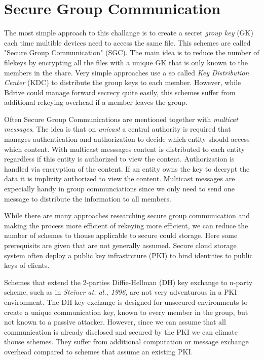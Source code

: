 \section{Secure Group Communication}
The most simple approach to this challange is to create a secret \textit{group key} (GK) each time multible devices need to access the same file. This schemes are called "Secure Group Communication" (SGC). The main idea is to reduce the number of filekeys by encrypting all the files with a unique GK that is only known to the members in the share. Very simple approaches use a so called \textit{Key Distribution Center} (KDC) to distribute the group keys to each member. However, while Bdrive could manage forward secrecy quite easily, this schemes suffer from additional rekeying overhead if a member leaves the group. 

Often Secure Group Communications are mentioned together with \textit{multicat messages}. The idea is that on \textit{unicast} a central authority is required that manages authentication and authorization to decide which entity should access which content. With multicast messsages content is distributed to each entity regardless if this entity is authorized to view the content. Authorization is handled via encryption of the content. If an entity owns the key to decrypt the data it is implizity authorized to view the content. Multicast messages are expecially handy in group communciations since we only need to send one message to distribute the information to all members. 

While there are many approaches researching secure group communication and making the process more efficient of rekeying more efficient, we can reduce the number of schemes to thouse applicable to secure could storage. Here some prerequisits are given that are not generally assumed. Secure cloud storage system often deploy a public key infrastrcture (PKI) to bind identities to public keys of clients.

Schemes that extend the 2-parties Diffie-Hellman (DH) key exchange to n-party scheme, such as in \textit{Steiner at. al., 1996}\cite{steiner1996diffie}, are not very adventurous in a PKI environment. The DH key exchange is designed for unsecured environments to create a unique communication key, known to every member in the group, but not known to a passive attacker. However, since we can assume that all communication is already disclosed and secured by the PKI we can elimate thouse schemes. They suffer from additional computation or message exchange overhead compared to schemes that assume an existing PKI.   

